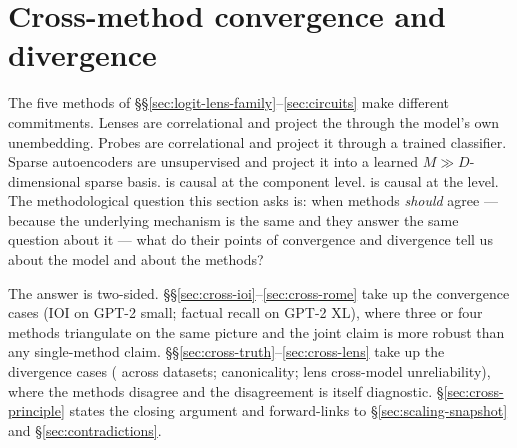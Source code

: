 
\section{Cross-method convergence and divergence}
\label{sec:cross-method}

The five methods of \S\S\ref{sec:logit-lens-family}--\ref{sec:circuits}
make different commitments. Lenses are correlational and project the
 through the model's own unembedding. Probes are
correlational and project it through a trained classifier. Sparse
autoencoders are unsupervised and project it into a learned
$M\!\gg\!D$-dimensional sparse basis.  is causal at
the component level.  is causal at the  level.
The methodological question this section asks is: when methods
\emph{should} agree --- because the underlying mechanism is the same
and they answer the same question about it --- what do their points
of convergence and divergence tell us about the model and about the
methods?

The answer is two-sided. \S\S\ref{sec:cross-ioi}--\ref{sec:cross-rome}
take up the convergence cases (IOI on GPT-2 small; factual recall
on GPT-2 XL), where three or four methods triangulate on the same
picture and the joint claim is more robust than any single-method
claim. \S\S\ref{sec:cross-truth}--\ref{sec:cross-lens} take up the
divergence cases ( across datasets;  
canonicality; lens cross-model unreliability), where the methods
disagree and the disagreement is itself diagnostic.
\S\ref{sec:cross-principle} states the closing argument and
forward-links to \S\ref{sec:scaling-snapshot} and
\S\ref{sec:contradictions}.

